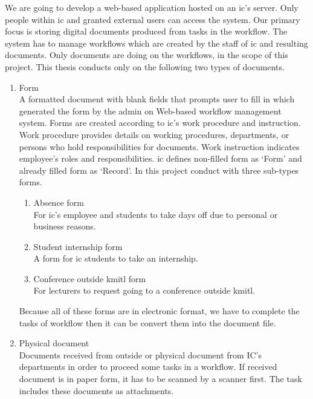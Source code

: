 We are going to develop a web-based application hosted on an \gls{ic}'s server.
Only people within \gls{ic} and granted external users can access the system.
Our primary focus is storing digital documents produced from tasks in the workflow.
The system has to manage workflows which are created by the staff of \gls{ic} and resulting documents.
Only documents are doing on the workflows, in the scope of this project.
This thesis conducts only on the following two types of documents.
\begin{enumerate}
\item Form \hfill \\
A formatted document with blank fields that prompts user to fill in which generated the form by the admin on Web-based workflow management system.
Forms are created according to \gls{ic}'s work procedure and instruction.
Work procedure provides details on working procedures, departments, or persons who hold responsibilities for documents.
Work instruction indicates employee's roles and responsibilities.
\gls{ic} defines non-filled form as \enquote*{Form} and already filled form as \enquote*{Record}.
In this project conduct with three sub-types forms.
\begin{enumerate}
\item Absence form \hfill \\
For \gls{ic}'s employee and students to take days off due to personal or business reasons.
\item Student internship form \hfill \\
A form for \gls{ic} students to take an internship.
\item Conference outside \gls{kmitl} form \hfill \\
For lecturers to request going to a conference outside \gls{kmitl}.
\end{enumerate}
Because all of these forms are in electronic format, we have to complete the tasks of workflow then it can be convert them into the document file.
\item Physical document \hfill \\
Documents received from outside or physical document from IC's departments in order to proceed some tasks in a workflow.
If received document is in paper form, it has to be scanned by a scanner first.
The task includes these documents as attachments.
\end{enumerate}